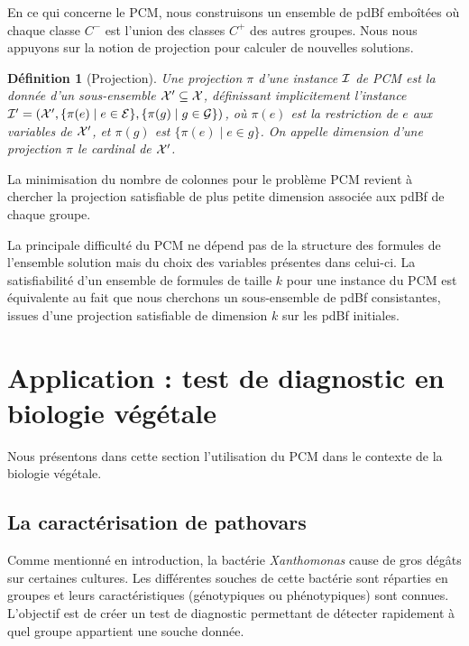 \documentclass[a4paper,10pt]{article}
\newtheorem{definition}{Définition}
\begin{document}
En ce qui concerne le PCM, nous construisons un ensemble de pdBf emboîtées où
chaque classe ${C}^{-}$ est l'union des classes ${C}^{+}$ des autres groupes.
Nous nous appuyons sur la notion de projection pour calculer de nouvelles
solutions.

\begin{definition}[Projection]
Une projection $\pi$ d'une instance ${\cal I}$ de PCM est la donnée d'un
sous-ensemble ${\cal X'} \subseteq {\cal X}$, définissant implicitement
l'instance ${\cal I'} = ({\cal X'},\{\pi(e) \mid e \in  {\cal E} \},\{ \pi(g)
\mid g \in {\cal G}\})$, où $\pi(e)$ est la restriction de $e$ aux variables de
${\cal X'}$, et $\pi(g)$ est $\{\pi(e)\mid e\in g\}$. On appelle
\emph{dimension} d'une projection $\pi$  le cardinal de ${\cal X'}$.
\end{definition}

La minimisation du nombre de colonnes pour le problème PCM revient à chercher la
projection satisfiable de plus petite dimension associée aux pdBf de chaque
groupe.

La principale difficulté du PCM ne dépend pas de la structure des formules de
l'ensemble solution mais du choix des variables présentes dans celui-ci. La
satisfiabilité d'un ensemble de formules de taille $k$  pour une instance du PCM est équivalente au fait que nous cherchons un sous-ensemble de pdBf consistantes, issues d'une projection satisfiable de dimension $k$ sur les pdBf initiales.

\section{Application : test de diagnostic en biologie végétale}

Nous présentons dans cette section l'utilisation du PCM dans le contexte de la biologie végétale.

\subsection{La caractérisation de pathovars}

Comme mentionné en introduction, la bactérie {\em Xanthomonas}  cause de gros
dégâts sur certaines cultures. Les différentes souches de cette bactérie sont
réparties en groupes et leurs caractéristiques (génotypiques ou phénotypiques)
sont connues. L'objectif est de créer un test de diagnostic permettant de
détecter rapidement à quel groupe appartient une souche donnée.
\end{document}
